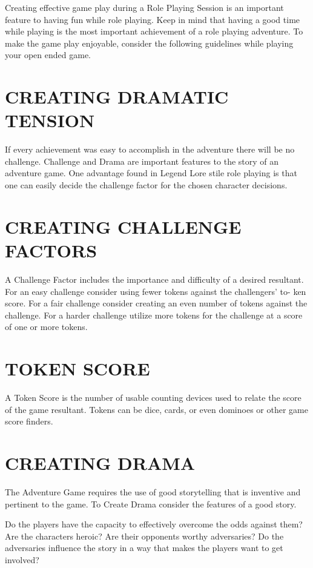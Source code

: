\documentclass{article}
\begin{document}
    Creating effective game play during a Role Playing Session is an important feature to having fun
while role playing. Keep in mind that having a good time while playing is the most important
achievement of a role playing adventure. To make the game play enjoyable, consider the
following guidelines while playing your open ended game.

\section{CREATING DRAMATIC TENSION}

	If every achievement was easy to accomplish in the adventure there will be no challenge.
Challenge and Drama are important features to the story of an adventure game. One advantage
found in Legend Lore stile role playing is that one can easily decide the challenge factor for the
chosen character decisions.

\section{CREATING CHALLENGE FACTORS}

	A Challenge Factor includes the importance and difficulty of a desired resultant. For an easy
challenge consider using fewer tokens against the challengers’ to- ken score. For a fair challenge
consider creating an even number of tokens against the challenge. For a harder challenge utilize
more tokens for the challenge at a score of one or more tokens.

\section{TOKEN SCORE}

A Token Score is the number of usable counting devices used to relate the score of the game
resultant. Tokens can be dice, cards, or even dominoes or other game score finders.

\section{CREATING DRAMA}

	The Adventure Game requires the use of good storytelling that is inventive and pertinent to the
game. To Create Drama consider the features of a good story.

	Do the players have the capacity to effectively overcome the odds against them? Are the
characters heroic? Are their opponents worthy adversaries? Do the adversaries influence the
story in a way that makes the players want to get involved?
\end{document}
